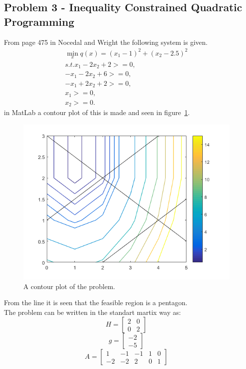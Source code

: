 \subsection{Problem 3 - Inequality Constrained Quadratic Programming}
From page 475 in Nocedal and Wright the following system is given.
\begin{equation}
\begin{split}
\min_{x} q(x) = (x_1-1)^2+(x_2-2.5)^2 \\
s.t. x_1-2x_2+2> = 0,\\
-x_1-2x_2+6>=0,\\
-x_1+2x_2+2>=0,\\
x_1>=0,\\
x_2>=0.
\end{split}
\end{equation}
in MatLab a contour plot of this is made and seen in figure~\ref{fig:exe3_contour_plot}.
\begin{figure}[H]
	\centering
		\includegraphics{exe3_contour_plot.png}
	\caption{A contour plot of the problem.}
	\label{fig:exe3_contour_plot}
\end{figure}
From the line it is seen that the feasible region is a pentagon.\\
The problem can be written in the standart martix way as:
\[H=\begin{bmatrix}
	2 & 0 \\0 & 2
\end{bmatrix}\]
\[g=\begin{bmatrix}
	-2 \\-5
\end{bmatrix}\]
\[A=\begin{bmatrix}
	1 & -1 & -1 & 1 & 0 \\
	-2 & -2 & 2 & 0 & 1
\end{bmatrix}\]
